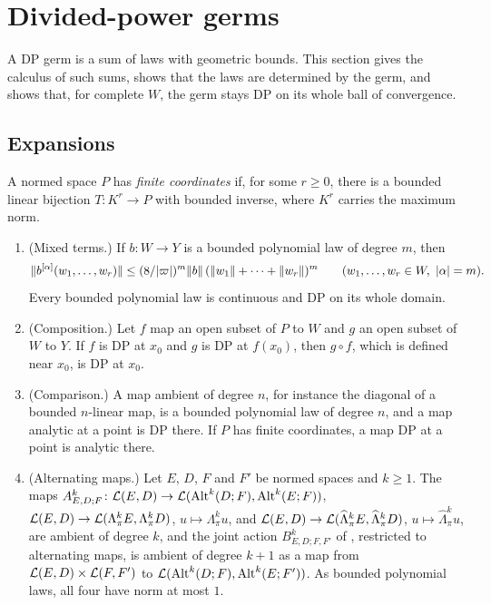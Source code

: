 \section{Divided-power germs}\label{dp:sec:germs}

A DP germ is a sum of laws with geometric bounds. This section gives the calculus of such sums, shows that the laws are determined by the germ, and shows that, for complete $W$, the germ stays DP on its whole ball of convergence.

\subsection{Expansions}\label{dp:ssec:expansions}

A normed space $P$ has \emph{finite coordinates} if, for some $r\ge0$, there is a bounded linear bijection $T\colon K^r\to P$ with bounded inverse, where $K^r$ carries the maximum norm.

\begin{theorem}\label{dp:thm:calculus}
\leavevmode
\begin{enumerate}
\item \textup{(Mixed terms.)} If $b\colon W\to Y$ is a bounded polynomial law of degree $m$, then
\[
 \lVert b^{[\alpha]}(w_1,\dots,w_r)\rVert\le(8/\lvert \varpi\rvert)^m\lVert b\rVert\,(\lVert w_1\rVert+\dots+\lVert w_r\rVert)^m
 \qquad(w_1,\dots,w_r\in W,\ \lvert \alpha\rvert=m).
\]
Every bounded polynomial law is continuous and DP on its whole domain.
\item \textup{(Composition.)} Let $f$ map an open subset of $P$ to $W$ and $g$ an open subset of $W$ to $Y$. If $f$ is
DP at $x_0$ and $g$ is DP at $f(x_0)$, then $g\circ f$, which is defined near $x_0$, is DP at $x_0$.
\item \textup{(Comparison.)} A map ambient of degree $n$, for instance the diagonal of a bounded $n$\nobreakdash-linear
map, is a bounded polynomial law of degree $n$, and a map analytic at a point is DP there. If $P$ has finite
coordinates, a map DP at a point is analytic there.
\item \textup{(Alternating maps.)} Let $E$, $D$, $F$ and $F'$ be normed spaces and $k\ge1$. The maps
$A^k_{E,D;F}\colon\mathcal L(E,D)\to\mathcal L(\operatorname{Alt}^k(D;F),\operatorname{Alt}^k(E;F))$, $\mathcal L(E,D)\to\mathcal L(\Lambda^k_\pi E,\Lambda^k_\pi D)$,
$u\mapsto\Lambda^k_\pi u$, and $\mathcal L(E,D)\to\mathcal L(\widehat\Lambda^k_\pi E,\widehat\Lambda^k_\pi D)$,
$u\mapsto\widehat\Lambda^k_\pi u$, are ambient of degree $k$, and the joint action $B^k_{E,D;F,F'}$ of
\cite[Proposition~2.2]{I}, restricted to alternating maps, is ambient of degree $k+1$ as a map from
$\mathcal L(E,D)\times\mathcal L(F,F')$ to $\mathcal L(\operatorname{Alt}^k(D;F),\operatorname{Alt}^k(E;F'))$. As bounded polynomial laws, all four have norm at most $1$.
\end{enumerate}
\end{theorem}

